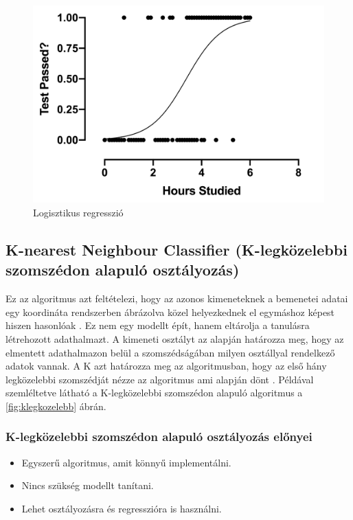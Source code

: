 \begin{figure}[h]
    \centering
    \includegraphics[width=\linewidth]{images/3.fejezet/LogisticRegression.png}
    \caption{Logisztikus regresszió \cite{logisztikusregresszio_abra}}
    \label{fig:logisztikusregresszio}
\end{figure}

\subsection{K-nearest Neighbour Classifier (K-legközelebbi szomszédon alapuló osztályozás)}
Ez az algoritmus azt feltételezi, hogy az azonos kimeneteknek a bemenetei adatai egy koordináta rendszerben ábrázolva közel helyezkednek el egymáshoz képest hiszen hasonlóak \cite{k_legkozelebbi_2}. Ez nem egy modellt épít, hanem eltárolja a tanulásra létrehozott adathalmazt. A kimeneti osztályt az alapján határozza meg, hogy az elmentett adathalmazon belül a szomszédságában milyen osztállyal rendelkező adatok vannak. A K azt határozza meg az algoritmusban, hogy az első hány legközelebbi szomszédját nézze az algoritmus ami alapján dönt \cite{k_legkozelebbi_1}. Példával szemléltetve látható a K-legközelebbi szomszédon alapuló algoritmus a \ref{fig:klegkozelebb} ábrán.

\subsubsection{K-legközelebbi szomszédon alapuló osztályozás előnyei}
\begin{itemize}
    \item Egyszerű algoritmus, amit könnyű implementálni.
    \item Nincs szükség modellt tanítani.
    \item Lehet osztályozásra és regresszióra is használni.
\end{itemize}

